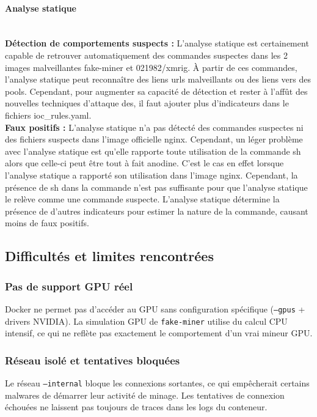 \noindent \paragraph{Analyse statique} \mbox{} \\

\noindent \textbf{Détection de comportements suspects :} L'analyse statique est certainement capable de retrouver automatiquement des commandes suspectes dans les 2 images malveillantes fake-miner et 021982/xmrig. À partir de ces commandes, l'analyse statique peut reconnaître des liens urls malveillants ou des liens vers des pools. Cependant, pour augmenter sa capacité de détection et rester à l'affût des nouvelles techniques d'attaque des, il faut ajouter plus d'indicateurs dans le fichiers ioc\_rules.yaml. \\

\noindent \textbf{Faux positifs :} L'analyse statique n'a pas détecté des commandes suspectes ni des fichiers suspects dans l'image officielle nginx. Cependant, un léger problème avec l'analyse statique est qu'elle rapporte toute utilisation de la commande sh alors que celle-ci peut être tout à fait anodine. C'est le cas en effet lorsque l'analyse statique a rapporté son utilisation dans l'image nginx. Cependant, la présence de sh dans la commande n'est pas suffisante pour que l'analyse statique le relève comme une commande suspecte. L'analyse statique détermine la présence de d'autres indicateurs pour estimer la nature de la commande, causant moins de faux positifs.


\subsection{Difficultés et limites rencontrées}
\subsubsection{Pas de support GPU réel}
Docker ne permet pas d'accéder au GPU sans configuration spécifique (\texttt{--gpus} + drivers NVIDIA). La simulation GPU de \texttt{fake-miner} utilise du calcul CPU intensif, ce qui ne reflète pas exactement le comportement d'un vrai mineur GPU.

\subsubsection{Réseau isolé et tentatives bloquées}
Le réseau \texttt{--internal} bloque les connexions sortantes, ce qui empêcherait certains malwares de démarrer leur activité de minage. Les tentatives de connexion échouées ne laissent pas toujours de traces dans les logs du conteneur.

